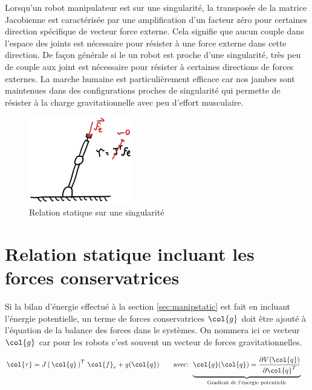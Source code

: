 Lorsqu'un robot manipulateur est sur une singularité, la transposée de la matrice Jacobienne est caractérisée par une amplification d'un facteur zéro pour certaines direction spécifique de vecteur force externe. Cela signifie que aucun couple dans l'espace des joints est nécessaire pour résister à une force externe dans cette direction. De façon générale si le un robot est proche d'une singularité, très peu de couple aux joint est nécessaire pour résister à certaines directions de forces externes. La marche humaine est particulièrement efficace car nos jambes sont maintenues dans des configurations proches de singularité qui permette de résister à la charge gravitationnelle avec peu d'effort musculaire. 
\begin{figure}[H]
	\centering
		\includegraphics[width=0.40\textwidth]{fig/externalforcesingularity.jpg}
	\caption{Relation statique sur une singularité}
	\label{fig:externalforcesingularity}
\end{figure}


\section{Relation statique incluant les forces conservatrices}
\label{sec:manipstaticconservative}

Si la bilan d'énergie effectué à la section \ref{sec:manipstatic} est fait en incluant l'énergie potentielle, un terme de forces conservatrices $\col{g}$ doit être ajouté à l'équation de la balance des forces dans le systèmes. On nommera ici ce vecteur $\col{g}$ car pour les robots c'est souvent un vecteur de forces gravitationnelles. 

\begin{align}
\col{\tau} &= J\left( \, \col{q} \, \right)^T \, \col{f}_e +  g( \col{q} )
\quad \quad \text{avec:  }
\underbrace{ \col{g} ( \col{q} ) = 
\frac{ \partial V(\col{q} ) }{\partial \col{q}^T } 
}_{\text{Gradient de l'énergie potentielle}}
\label{eq:staticgravity}
\end{align}

